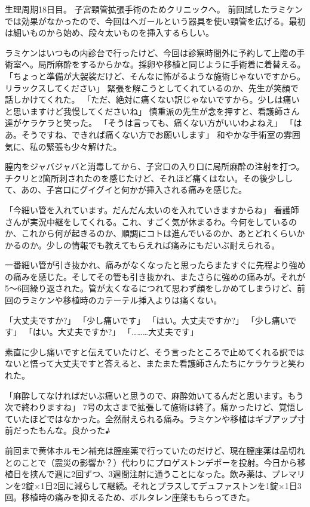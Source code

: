 生理周期18日目。
子宮頸管拡張手術のためクリニックへ。
前回試したラミケンでは効果がなかったので、今回はヘガールという器具を使い頸管を広げる。最初は細いものから始め、段々太いものを挿入するらしい。

ラミケンはいつもの内診台で行ったけど、今回は診察時間外に予約して上階の手術室へ。局所麻酔をするからかな。採卵や移植と同じように手術着に着替える。
「ちょっと準備が大袈裟だけど、そんなに怖がるような施術じゃないですから。リラックスしてください」
緊張を解こうとしてくれているのか、先生が笑顔で話しかけてくれた。
「ただ、絶対に痛くない訳じゃないですから。少しは痛いと思いますけど我慢してくださいね」
慎重派の先生が念を押すと、看護師さん達がケラケラと笑った。
「そうは言っても、痛くない方がいいわよねえ」
「はあ。そうですね、できれば痛くない方でお願いします」
和やかな手術室の雰囲気に、私の緊張も少々解けた。

膣内をジャバジャバと消毒してから、子宮口の入り口に局所麻酔の注射を打つ。チクリと2箇所刺されたのを感じたけど、それほど痛くはない。その後少しして、あの、子宮口にグイグイと何かが挿入される痛みを感じた。

「今細い管を入れています。だんだん太いのを入れていきますからね」
看護師さんが実況中継をしてくれる。これ、すごく気が休まるわ。今何をしているのか、これから何が起きるのか、順調にコトは進んでいるのか、あとどれくらいかかるのか。少しの情報でも教えてもらえれば痛みにもだいぶ耐えられる。

一番細い管が引き抜かれ、痛みがなくなったと思ったらまたすぐに先程より強めの痛みを感じた。そしてその管も引き抜かれ、またさらに強めの痛みが。それが5～6回繰り返された。管が太くなるにつれて思わず顔をしかめてしまうけど、前回のラミケンや移植時のカテーテル挿入よりは痛くない。

「大丈夫ですか?」
「少し痛いです」
「はい。大丈夫ですか?」
「少し痛いです」
「はい。大丈夫ですか?」
「………大丈夫です」

素直に少し痛いですと伝えていたけど、そう言ったところで止めてくれる訳ではないと悟って大丈夫ですと答えると、またまた看護師さんたちにケラケラと笑われた。

「麻酔してなければだいぶ痛いと思うので、麻酔効いてるんだと思います。もう次で終わりますね」
7号の太さまで拡張して施術は終了。痛かったけど、覚悟していたほどではなかった。全然耐えられる痛み。ラミケンや移植はギブアップ寸前だったもんな。良かった♪

前回まで黄体ホルモン補充は膣座薬で行っていたのだけど、現在膣座薬は品切れとのことで（震災の影響か？）代わりにプロゲストンデポーを投射。今日から移植日を挟んで週に2回ずつ、3週間注射に通うことになった。飲み薬は、プレマリンを2錠×1日2回に減らして継続。それとプラスしてデュファストンを1錠×1日3回。移植時の痛みを抑えるため、ボルタレン座薬ももらってきた。

